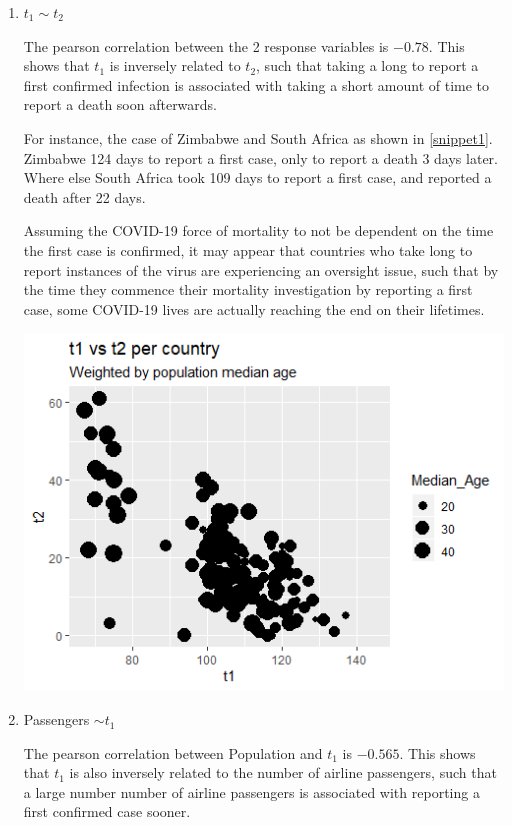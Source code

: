 \documentclass[]{report}
\begin{document}
\begin{enumerate}
	\item{$t_1 \sim t_2$}
	
	The pearson correlation between the 2 response variables is  $-0.78$. This shows that $t_1$ is inversely related to $t_2$, such that taking a long to report a first confirmed infection is associated with taking a short amount of time to report a death soon afterwards.
	
	For instance, the case of Zimbabwe and South Africa as shown in \ref{snippet1}. Zimbabwe 124 days to report a first case, only to report a death 3 days later. Where else South Africa took 109 days to report a first case, and reported a death after 22 days.
	
	Assuming the COVID-19 force of mortality to not be dependent on the time the first case is confirmed, it may appear that countries who take long to report instances of the virus are experiencing an oversight issue, such that by the time they commence their mortality investigation by reporting a first case, some COVID-19 lives are actually reaching the end on their lifetimes.
	
	\includegraphics{t1vt2.png}
	
	\newpage
	
	\item{Passengers $\sim t_1$}
	
	The pearson correlation between Population and $t_1$ is $-0.565$. This shows that $t_1$ is also inversely related to the number of airline passengers, such that a large number number of airline passengers is associated with reporting a first confirmed case sooner. 
	

\end{enumerate}
\end{document}
